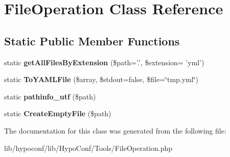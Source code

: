 \hypertarget{class_tools_1_1_file_operation}{
\section{\-File\-Operation \-Class \-Reference}
\label{class_tools_1_1_file_operation}
}
\subsection*{\-Static \-Public \-Member \-Functions}
\begin{DoxyCompactItemize}
\item 
\hypertarget{class_tools_1_1_file_operation_a6dac1abc3022a6453a1540895bce1145}{
static {\bfseries get\-All\-Files\-By\-Extension} (\$path='.', \$extension= 'yml')}
\label{class_tools_1_1_file_operation_a6dac1abc3022a6453a1540895bce1145}

\item 
\hypertarget{class_tools_1_1_file_operation_a17c271aa513e0ee8d597f2f5cc615076}{
static {\bfseries \-To\-Y\-A\-M\-L\-File} (\$array, \$stdout=false, \$file=\char`\"{}tmp.\-yml\char`\"{})}
\label{class_tools_1_1_file_operation_a17c271aa513e0ee8d597f2f5cc615076}

\item 
\hypertarget{class_tools_1_1_file_operation_af33a160cf6a0dcb49c499533a49d31f1}{
static {\bfseries pathinfo\-\_\-utf} (\$path)}
\label{class_tools_1_1_file_operation_af33a160cf6a0dcb49c499533a49d31f1}

\item 
\hypertarget{class_tools_1_1_file_operation_a9d78fbdd036777dda95c3d5b1cfae29a}{
static {\bfseries \-Create\-Empty\-File} (\$path)}
\label{class_tools_1_1_file_operation_a9d78fbdd036777dda95c3d5b1cfae29a}

\end{DoxyCompactItemize}


\-The documentation for this class was generated from the following file\-:\begin{DoxyCompactItemize}
\item 
lib/hypoconf/lib/\-Hypo\-Conf/\-Tools/\-File\-Operation.\-php\end{DoxyCompactItemize}
